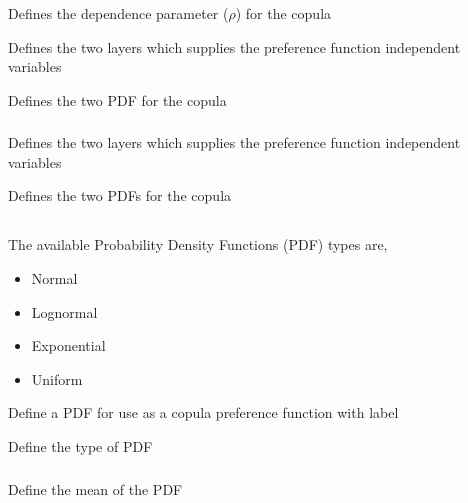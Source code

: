  {Defines the dependence parameter ($\rho$) for the copula}

 {Defines the two layers which supplies the preference function independent variables}

 {Defines the two PDF for the copula}

\subsubsection[Independence copula]{}

 {Defines the two layers which supplies the preference function independent variables}

 {Defines the two PDFs for the copula}

\subsection{}

The available Probability Density Functions (PDF) types are,

\begin{itemize}
	\item Normal
	\item Lognormal
	\item Exponential
	\item Uniform
\end{itemize}

 {Define a PDF for use as a copula preference function with label}

 {Define the type of PDF}

\subsubsection[Normal]{}

 {Define the mean of the PDF}

